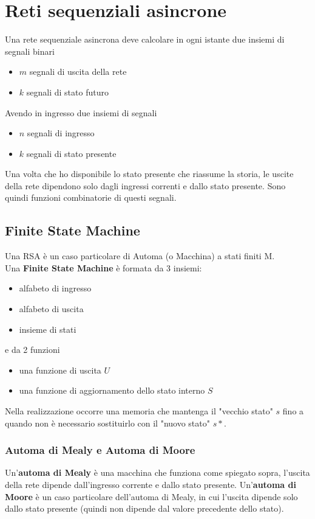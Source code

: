 \documentclass{article}
\begin{document}
\section{Reti sequenziali asincrone}
Una rete sequenziale asincrona deve calcolare in ogni istante due insiemi di segnali binari
\begin{itemize}
    \item $m$ segnali di uscita della rete
    \item $k$ segnali di stato futuro
\end{itemize}
Avendo in ingresso due insiemi di segnali
\begin{itemize}
    \item $n$ segnali di ingresso
    \item $k$ segnali di stato presente
\end{itemize}
Una volta che ho disponibile lo stato presente che riassume la storia, le uscite della rete dipendono solo dagli ingressi correnti e dallo stato presente. Sono quindi funzioni combinatorie di questi segnali.




\subsection{Finite State Machine}
Una RSA è un caso particolare di Automa (o Macchina) a stati finiti M.\\
Una \textbf{\color{cyan} Finite State Machine} è formata da 3 insiemi:
\begin{itemize}
    \item alfabeto di ingresso
    \item alfabeto di uscita
    \item insieme di stati
\end{itemize}
e da 2 funzioni
\begin{itemize}
    \item una funzione di uscita $U$
    \item una funzione di aggiornamento dello stato interno $S$
\end{itemize}
Nella realizzazione occorre una memoria che mantenga il "vecchio stato" $s$ fino a quando non è necessario sostituirlo con il "nuovo stato" $s*$.




\subsubsection{Automa di Mealy e Automa di Moore}
Un'\textbf{automa di Mealy} è una macchina che funziona come spiegato sopra, l'uscita della rete dipende dall'ingresso corrente e dallo stato presente. Un'\textbf{automa di Moore} è un caso particolare dell'automa di Mealy, in cui l'uscita dipende solo dallo stato presente (quindi non dipende dal valore precedente dello stato).
\end{document}
